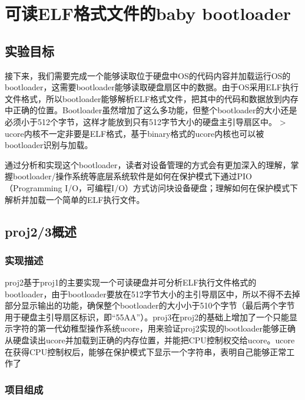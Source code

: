 \section{可读ELF格式文件的baby
bootloader}\label{ux53efux8bfbelfux683cux5f0fux6587ux4ef6ux7684baby-bootloader}

\subsection{实验目标}\label{ux5b9eux9a8cux76eeux6807}

接下来，我们需要完成一个能够读取位于硬盘中OS的代码内容并加载运行OS的bootloader，这需要bootloader能够读取硬盘扇区中的数据。由于OS采用ELF执行文件格式，所以bootloader能够解析ELF格式文件，把其中的代码和数据放到内存中正确的位置。Bootloader虽然增加了这么多功能，但整个bootloader的大小还是必须小于512个字节，这样才能放到只有512字节大小的硬盘主引导扇区中。
\textgreater{}
ucore内核不一定非要是ELF格式，基于binary格式的ucore内核也可以被bootloader识别与加载。

通过分析和实现这个bootloader，读者对设备管理的方式会有更加深入的理解，掌握bootloader/操作系统等底层系统软件是如何在保护模式下通过PIO（Programming
I/O，可编程I/O）方式访问块设备硬盘；理解如何在保护模式下解析并加载一个简单的ELF执行文件。

\subsection{proj2/3概述}\label{proj23ux6982ux8ff0}

\subsubsection{实现描述}\label{ux5b9eux73b0ux63cfux8ff0}

proj2基于proj1的主要实现一个可读硬盘并可分析ELF执行文件格式的bootloader，由于bootloader要放在512字节大小的主引导扇区中，所以不得不去掉部分显示输出的功能，确保整个bootloader的大小小于510个字节（最后两个字节用于硬盘主引导扇区标识，即``55AA''）。proj3在proj2的基础上增加了一个只能显示字符的第一代幼稚型操作系统ucore，用来验证proj2实现的bootloader能够正确从硬盘读出ucore并加载到正确的内存位置，并能把CPU控制权交给ucore。ucore在获得CPU控制权后，能够在保护模式下显示一个字符串，表明自己能够正常工作了

\subsubsection{项目组成}\label{ux9879ux76eeux7ec4ux6210}

